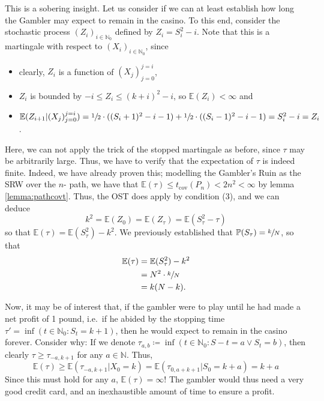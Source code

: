 	This is a sobering insight. Let us consider if we can at least establish how long the 
	Gambler may expect to remain in the casino. To this end, consider the stochastic process 
	$(Z_i)_{i\in\mathbb{N}_0}$ defined by $Z_i = S_i^2 - i$. Note that this is a martingale 
	with respect to $(X_i)_{i\in\mathbb{N}_0}$, since 
	\begin{itemize}
		\item clearly, $Z_i$ is a function of $(X_j)_{j=0}^{j=i}$,
		\item $Z_i$ is bounded by $-i\leq Z_i\leq(k+i)^2-i$, so $\mathbb{E}(Z_i)<\infty$ 
		and
		\item $\mathbb{E}(Z_{i+1} | (X_j)_{j=0}^{j=i})=\sfrac{1}{2}\cdot((S_i + 1)^2-i-1)+
		\sfrac{1}{2}\cdot((S_i-1)^2 - i-1) = S_i^2 - i = Z_i$.
	\end{itemize}
	Here, we can not apply the trick of the stopped martingale as before, since $\tau$ may be 
	arbitrarily large. Thus, we have to verify that the expectation of $\tau$ is indeed finite.
	Indeed, we have already proven this; modelling the Gambler's Ruin as the SRW over the $n$-%
	path, we have that $\mathbb{E}(\tau) \leq t_\mathrm{cov}(P_n) < 2n^2 <\infty$ by lemma 
	\ref{lemma:pathcovt}. Thus, the OST does apply by condition (3), and we can deduce
	$$
		k^2 = \mathbb{E}(Z_0) = \mathbb{E}(Z_\tau) = \mathbb{E}(S_\tau^2-\tau)
	$$
	so that $\mathbb{E}(\tau) = \mathbb{E}(S_\tau^2) - k^2$. We previously established that 
	$\mathbb{P}(S_\tau) = \sfrac{k}{N}$, so that 
	\begin{align*}
		\mathbb{E}(\tau) &= \mathbb{E}(S_\tau^2) - k^2 \\
		&= N^2 \cdot \sfrac{k}{N} \\
		&= k(N-k).
	\end{align*}

	Now, it may be of interest that, if the gambler were to play until he had made a net 
	profit of 1 pound, i.e.\ if he abided by the stopping time $\tau' = \inf(t\in\mathbb{N}_0 
	: S_t = k+1)$, then he would expect to remain in the casino forever. Consider why: If we 
	denote $\tau_{a,b} \coloneqq \inf(t\in\mathbb{N}_0: S-t = a \lor S_t = b)$, then clearly $
	\tau \geq \tau_{-a, k+1}$ for any $a \in\mathbb{N}$. Thus,
	$$
	\mathbb{E}(\tau) \geq \mathbb{E}(\tau_{-a, k+1} | X_0 = k) = 
	\mathbb{E}(\tau_{0,a+k+1}|S_0=k+a) = k+a
	$$ 
	Since this must hold for any $a$, $\mathbb{E}(\tau) = \infty$! The gambler would thus need a 
	very good credit card, and an inexhaustible amount of time to ensure a profit.


